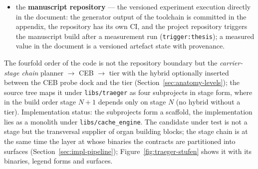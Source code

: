 \begin{nurkurz}
\begin{itemize}
  \item the \textbf{manuscript repository} --- the versioned experiment execution directly in the
  document: the generator output of the toolchain is committed in the appendix, the repository has its
  own CI, and the project repository triggers the manuscript build after a measurement run
  (\texttt{trigger:thesis}); a measured value in the document is a versioned artefact state with
  provenance.
\end{itemize}
The fourfold order of the code is not the repository boundary but the \emph{carrier-stage chain}
planner $\to$ CEB $\to$ tier with the hybrid optionally inserted between the CEB probe dock and the tier
(Section~\ref{sec:anatomy-levels}); the source tree maps it under \texttt{libs/traeger} as four
subprojects in stage form, where in the build order stage $N+1$ depends only on stage $N$ (no hybrid
without a tier). Implementation status: the subprojects form a scaffold, the implementation lies as a
monolith under \texttt{libs/\allowbreak{}cache\_\allowbreak{}engine}. The candidate under test is not a
stage but the transversal supplier of organ building blocks; the stage chain is at the same time the
layer at whose binaries the contracts are partitioned into surfaces (Section~\ref{sec:impl-pipeline});
Figure~\ref{fig:traeger-stufen} shows it with its binaries, legend forms and surfaces.
\begin{figure}[htbp]\centering
{}
\end{figure}
\end{nurkurz}
